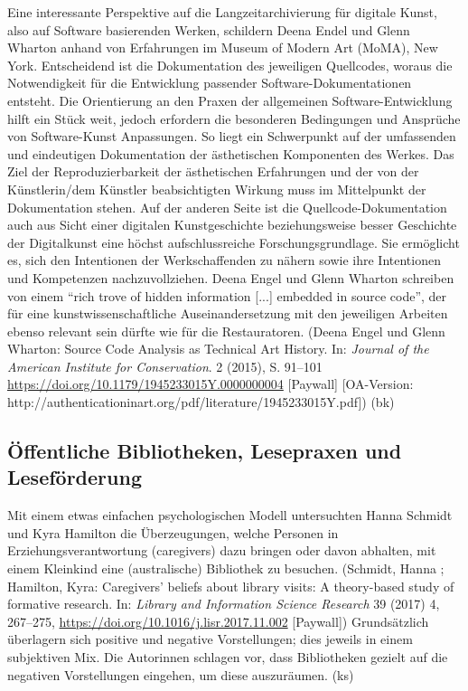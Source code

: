 \documentclass[a4paper,
fontsize=11pt,
oneside,
numbers=noperiodatend,
parskip=half-,
bibliography=totoc,
final
]{scrartcl}
\begin{document}
Eine interessante Perspektive auf die Langzeitarchivierung für digitale
Kunst, also auf Software basierenden Werken, schildern Deena Endel und
Glenn Wharton anhand von Erfahrungen im Museum of Modern Art (MoMA), New
York. Entscheidend ist die Dokumentation des jeweiligen Quellcodes,
woraus die Notwendigkeit für die Entwicklung passender
Software-Dokumentationen entsteht. Die Orientierung an den Praxen der
allgemeinen Software-Entwick\-lung hilft ein Stück weit, jedoch erfordern
die besonderen Bedingungen und Ansprüche von Software-Kunst Anpassungen.
So liegt ein Schwerpunkt auf der umfassenden und eindeutigen
Dokumentation der ästhetischen Komponenten des Werkes. Das Ziel der
Reproduzierbarkeit der ästhetischen Erfahrungen und der von der
Künstlerin/dem Künstler beabsichtigten Wirkung muss im Mittelpunkt der
Dokumentation stehen. Auf der anderen Seite ist die
Quellcode-Dokumentation auch aus Sicht einer digitalen Kunstgeschichte
beziehungsweise besser Geschichte der Digitalkunst eine höchst
aufschlussreiche Forschungsgrundlage. Sie ermöglicht es, sich den
Intentionen der Werkschaffenden zu nähern sowie ihre Intentionen und
Kompetenzen nachzuvollziehen. Deena Engel und Glenn Wharton schreiben
von einem \enquote{rich trove of hidden information {[}...{]} embedded
in source code}, der für eine kunstwissenschaftliche Auseinandersetzung
mit den jeweiligen Arbeiten ebenso relevant sein dürfte wie für die
Restauratoren. (Deena Engel und Glenn Wharton: Source Code Analysis as
Technical Art History. In: \emph{Journal of the American Institute for
Conservation}. 2 (2015), S. 91--101
\url{https://doi.org/10.1179/1945233015Y.0000000004} {[}Paywall{]}
{[}OA-Version:
http://authenticationinart.org/pdf/literature/1945233015Y.pdf{]}) (bk)

\hypertarget{uxf6ffentliche-bibliotheken-lesepraxen-und-lesefuxf6rderung}{%
\subsection{Öffentliche Bibliotheken, Lesepraxen und
Leseförderung}\label{uxf6ffentliche-bibliotheken-lesepraxen-und-lesefuxf6rderung}}

Mit einem etwas einfachen psychologischen Modell untersuchten Hanna
Schmidt und Kyra Hamilton die Überzeugungen, welche Personen in
Erziehungsverantwortung (caregivers) dazu bringen oder davon abhalten,
mit einem Kleinkind eine (australische) Bibliothek zu besuchen.
(Schmidt, Hanna ; Hamilton, Kyra: Caregivers' beliefs about library
visits: A theory-based study of formative research. In: \emph{Library
and Information Science Research} 39 (2017) 4, 267--275,
\url{https://doi.org/10.1016/j.lisr.2017.11.002} {[}Paywall{]})
Grundsätzlich überlagern sich positive und negative Vorstellungen; dies
jeweils in einem subjektiven Mix. Die Autorinnen schlagen vor, dass
Bibliotheken gezielt auf die negativen Vorstellungen eingehen, um diese
auszuräumen. (ks)
\end{document}
